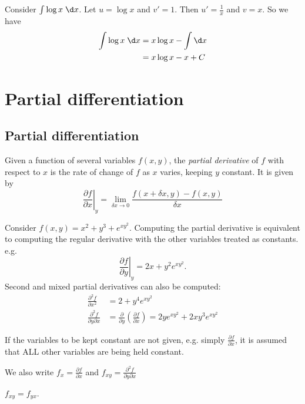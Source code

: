 \documentclass[a4paper]{article}
\begin{document}
\begin{eg}
  Consider $\int \log x\; \d x$. Let $u = \log x$ and $v' = 1$. Then $u' = \frac{1}{x}$ and $v = x$. So we have
  \begin{align*}
    \int \log x\; \d x &= x\log x - \int \d x\\
    &= x \log x - x + C
  \end{align*}
\end{eg}

\section{Partial differentiation}
\subsection{Partial differentiation}
\begin{defi}
  Given a function of several variables $f(x, y)$, the \emph{partial derivative} of $f$ with respect to $x$ is the rate of change of $f$ as $x$ varies, keeping $y$ constant. It is given by
  \[
  \left. \frac{\partial f}{\partial x}\right|_y = \lim_{\delta x\to 0} \frac{f(x + \delta x, y) - f(x, y)}{\delta x}
  \]
\end{defi}

\begin{eg}
  Consider $f(x, y) = x^2 + y^3 + e^{xy^2}$. Computing the partial derivative is equivalent to computing the regular derivative with the other variables treated as constants. e.g.
  \[
  \left.\frac{\partial f}{\partial y}\right|_y = 2x + y^2e^{xy^2}.
  \]
Second and mixed partial derivatives can also be computed:
\begin{align*}
  \frac{\partial^2f}{\partial x^2} &= 2 + y^4e^{xy^2}\\
  \frac{\partial^2 f}{\partial y\partial x} &= \frac{\partial}{\partial y}\left(\frac{\partial f}{\partial x}\right) = 2ye^{xy^2} + 2xy^{3}e^{xy^2}
\end{align*}

\end{eg}
\begin{notation}
  If the variables to be kept constant are not given, e.g. simply $\frac{\partial f}{\partial x}$, it is assumed that ALL other variables are being held constant.

  We also write $f_x = \frac{\partial f}{\partial x}$ and $f_{xy} = \frac{\partial^2 f}{\partial y\partial x}$
\end{notation}
\begin{thm}
  $f_{xy} = f_{yx}$.
\end{thm}
\end{document}
